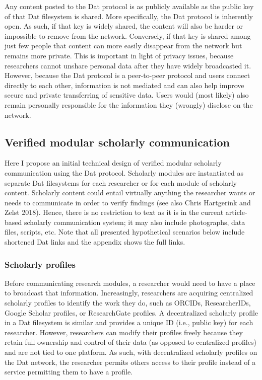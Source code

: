\documentclass[a4paper]{article}
\begin{document}
Any content posted to the Dat protocol is as publicly available as the
public key of that Dat filesystem is shared. More specifically, the Dat
protocol is inherently open. As such, if that key is widely shared, the
content will also be harder or impossible to remove from the network.
Conversely, if that key is shared among just few people that content can
more easily disappear from the network but remains more private. This is
important in light of privacy issues, because researchers cannot unshare
personal data after they have widely broadcasted it. However, because
the Dat protocol is a peer-to-peer protocol and users connect directly
to each other, information is not mediated and can also help improve
secure and private transferring of sensitive data. Users would (most
likely) also remain personally responsible for the information they
(wrongly) disclose on the network.

\hypertarget{verified-modular-scholarly-communication}{%
\subsection{Verified modular scholarly
communication}\label{verified-modular-scholarly-communication}}

Here I propose an initial technical design of verified modular scholarly
communication using the Dat protocol. Scholarly modules are instantiated
as separate Dat filesystems for each researcher or for each module of
scholarly content. Scholarly content could entail virtually anything the
researcher wants or needs to communicate in order to verify findings
(see also Chris Hartgerink and Zelst 2018). Hence, there is no
restriction to text as it is in the current article-based scholarly
communication system; it may also include photographs, data files,
scripts, etc. Note that all presented hypothetical scenarios below
include shortened Dat links and the appendix shows the full links.

\hypertarget{scholarly-profiles}{%
\subsubsection{Scholarly profiles}\label{scholarly-profiles}}

Before communicating research modules, a researcher would need to have a
place to broadcast that information. Increasingly, researchers are
acquiring centralized scholarly profiles to identify the work they do,
such as ORCIDs, ResearcherIDs, Google Scholar profiles, or ResearchGate
profiles. A decentralized scholarly profile in a Dat filesystem is
similar and provides a unique ID (i.e., public key) for each researcher.
However, researchers can modify their profiles freely because they
retain full ownership and control of their data (as opposed to
centralized profiles) and are not tied to one platform. As such, with
decentralized scholarly profiles on the Dat network, the researcher
permits others access to their profile instead of a service permitting
them to have a profile.
\end{document}

